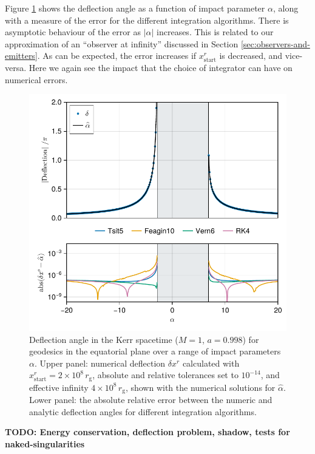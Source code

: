 \documentclass[fleqn,usenatbib]{mnras}
\newcommand{\todo}[1]{{\noindent \bf \color{red} TODO: #1}}
\newcommand{\rg}{r_\text{g}}
\begin{document}
Figure \ref{fig:deflection-angle} shows the deflection angle as a function of
impact parameter $\alpha$, along with a  measure of the error for the different
integration algorithms. There is asymptotic behaviour of the error as $\lvert
\alpha \rvert$ increases. This is related to our approximation of an ``observer
at infinity'' discussed in Section \ref{sec:observers-and-emitters}. As can be
expected, the error increases if $x^r_\text{start}$ is decreased, and
vice-versa. Here we again see the impact that the choice of integrator can have
on numerical errors.

\begin{figure}
	\centering
	\includegraphics[width=0.94\linewidth]{figures/deflection.iyer-hansen.pdf}
	\caption{Deflection angle in the Kerr spacetime ($M = 1$, $a = 0.998$) for geodesics in the equatorial plane over a range of impact parameters $\alpha$. Upper panel: numerical deflection $\delta x^r$ calculated with  $x^r_\text{start} = 2 \times 10^8 \, \rg$, absolute and relative tolerances set to $10^{-14}$, and effective infinity $4 \times 10^8\, \rg$, shown with the numerical solutions for $\hat{\alpha}$. Lower panel: the absolute relative error between the numeric and analytic deflection angles for different integration algorithms.}
	\label{fig:deflection-angle}
\end{figure}


\todo{Energy conservation, deflection problem, shadow, tests for naked-singularities}
\end{document}
